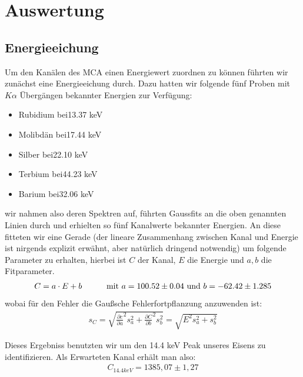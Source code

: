 \documentclass[12pt]{article}
\begin{document}
\section{Auswertung}
\subsection{Energieeichung}

Um den Kanälen des MCA einen Energiewert zuordnen zu können führten wir zunächst eine Energieeichung durch. Dazu hatten wir folgende fünf Proben mit $K\alpha$ Übergängen
bekannter Energien zur Verfügung:
\begin{itemize}
 \item Rubidium bei\hspace{30pt}13.37 keV
 \item Molibdän bei\hspace{30pt}17.44 keV
 \item Silber	bei\hspace{30pt}22.10 keV
 \item Terbium  bei\hspace{30pt}44.23 keV
 \item Barium   bei\hspace{30pt}32.06 keV
\end{itemize}

wir nahmen also deren Spektren auf, führten Gaussfits an die oben genannten Linien durch und erhielten so fünf Kanalwerte bekannter Energien. An diese fitteten 
wir eine Gerade (der lineare Zusammenhang zwischen Kanal und Energie ist nirgends explizit erwähnt, aber natürlich dringend notwendig) um folgende Parameter
zu erhalten, hierbei ist $C$ der Kanal, $E$ die Energie und $a,b$ die Fitparameter.
\begin{align*}
  C = a \cdot E + b \hspace{30pt} \textnormal{mit }a = 100.52 \pm 0.04\textnormal{ und }b =  -62.42 \pm 1.285
\end{align*}
wobai für den Fehler die Gaußsche Fehlerfortpflanzung anzuwenden ist:
\begin{align*}
  s_C = \sqrt{\frac{\partial{c}}{\partial{a}}^2 s_a^2 + \frac{\partial{C}}{\partial{b}}^2 s_b^2 } = \sqrt{E^2 s_a^2 + s_b^2}
\end{align*}

Dieses Ergebniss benutzten wir um den 14.4 keV Peak unseres Eisens zu identifizieren. Als Erwarteten Kanal erhält man also:
\begin{align*}
  C_{14.4keV} = 1385,07 \pm 1,27
\end{align*}
\end{document}
